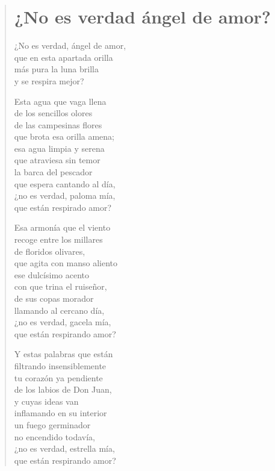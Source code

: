 \documentclass[12pt, twoside]{book}
\begin{document}
\newpage
\begin{verse}
\begin{center}
\section{¿No es verdad ángel de amor?}
\end{center}
¿No es verdad, ángel de amor,\\
que en esta apartada orilla\\
más pura la luna brilla\\
y se respira mejor?
\newline

Esta agua que vaga llena\\
de los sencillos olores\\
de las campesinas flores\\
que brota esa orilla amena;\\
esa agua limpia y serena\\
que atraviesa sin temor\\
la barca del pescador\\
que espera cantando al día,\\
¿no es verdad, paloma mía,\\
que están respirado amor?
\newline

Esa armonía que el viento\\
recoge entre los millares\\
de floridos olivares,\\
que agita con manso aliento\\
ese dulcísimo acento\\
con que trina el ruiseñor,\\
de sus copas morador\\
llamando al cercano día,\\
¿no es verdad, gacela mía,\\
que están respirando amor?
\newpage

Y estas palabras que están\\
filtrando insensiblemente\\
tu corazón ya pendiente\\
de los labios de Don Juan,\\
y cuyas ideas van\\
inflamando en su interior\\
un fuego germinador\\
no encendido todavía,\\
¿no es verdad, estrella mía,\\
que están respirando amor?
\newline


\end{verse}
\end{document}
